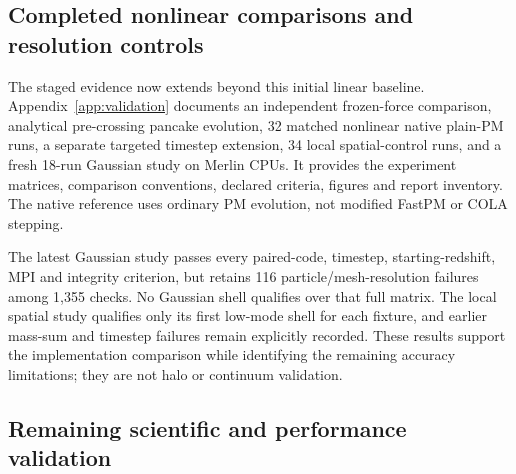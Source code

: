 \documentclass[11pt]{article}
\begin{document}
\subsection{Completed nonlinear comparisons and resolution controls}

The staged evidence now extends beyond this initial linear baseline.
Appendix~\ref{app:validation} documents an independent frozen-force comparison,
analytical pre-crossing pancake evolution, 32 matched nonlinear native plain-PM
runs, a separate targeted timestep extension, 34 local spatial-control runs,
and a fresh 18-run Gaussian study on Merlin CPUs.  It provides the experiment
matrices, comparison conventions, declared criteria, figures and report inventory.
The native reference uses ordinary PM evolution, not modified FastPM or COLA
stepping.

The latest Gaussian study passes every paired-code, timestep, starting-redshift,
MPI and integrity criterion, but retains 116 particle/mesh-resolution failures
among 1,355 checks.  No Gaussian shell qualifies over that full matrix.  The
local spatial study qualifies only its first low-mode shell for each fixture,
and earlier mass-sum and timestep failures remain explicitly recorded.
These results support the implementation comparison while identifying the
remaining accuracy limitations; they are not halo or continuum validation.

\subsection{Remaining scientific and performance validation}
\end{document}
